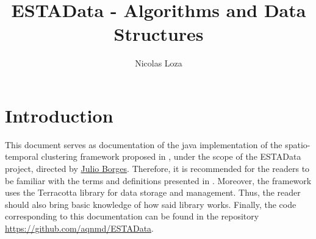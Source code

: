 \documentclass{article}
\author{Nicolas Loza}
\title{ESTAData - Algorithms and Data Structures}
\date{}
\begin{document}
	\maketitle
	\section{Introduction}
		This document serves as documentation of the java implementation of the spatio-temporal 
		clustering framework proposed in \cite{BBTRB}, under the scope of the ESTAData project,
		directed by \href{https://scholar.google.com/citations?user=IUoh6nMAAAAJ}{Julio Borges}. 
		Therefore, it is recommended for the readers to be familiar with the 
		terms and definitions presented in \cite{BBTRB}. Moreover, the framework uses the Terracotta
		library for data storage and management. Thus, the reader should also bring basic knowledge
		of how said library works. Finally, the code corresponding to this documentation can be found 
		in the repository \url{https://github.com/aqnmd/ESTAData}.
				
		
\end{document}
